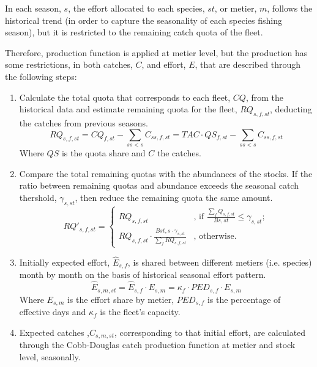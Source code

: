   In each season, $s$, the effort allocated to each species, $st$, or metier, $m$, follows the historical trend (in order to capture the 
  seasonality of each species fishing season), but it is restricted to the remaining catch quota of the fleet. 
  
  Therefore, production function is applied at metier level, but the production has some restrictions, 
  in both catches, $C$, and effort, $E$, that are described through the following steps: 
  
  \begin{enumerate}
    
    \item Calculate the total quota that corresponds to each fleet, $CQ$, from the historical data and estimate remaining
    quota for the fleet, $RQ_{s,f,st}$, deducting the catches from previous seasons.
  					$$RQ_{s,f,st} = CQ_{f,st} - \sum_{ss<s} {C_{ss,f,st}} = TAC \cdot QS_{f,st} - \sum_{ss<s} {C_{ss,f,st}}$$
    \noindent Where $QS$ is the quota share and $C$ the catches.
    
    \item Compare the total remaining quotas with the abundances of the stocks. If the ratio between remaining quotas and
    abundance exceeds the seasonal catch thershold, $\gamma_{s,st}$, then reduce the remaining quota the same amount.
    		\[
     			RQ'_{s,f,st} = \begin{cases}
       							RQ_{s,f,st} & \text{, if } \frac {\sum_f Q_{s,f,st}}{B{s,st}} \leq \gamma_{s,st}; \\
       							RQ_{s,f,st} \cdot  \frac{B{st,s} \cdot \gamma_{s,st}} {\sum_{f} RQ_{s,f,st}} & \text{, otherwise.} 
                     \end{cases}
    		\]
		
    \item Initially expected effort, $\hat E_{s,f}$, is shared between different metiers (i.e. species) month by month
    on the basis of historical seasonal effort pattern.
    				$$\hat E_{s,m,st} = \hat E_{s,f} \cdot E_{s,m} = \kappa_f \cdot PED_{s,f} \cdot  E_{s,m}$$
    \noindent Where $E_{s,m}$ is the effort share by metier, $PED_{s,f}$ is the percentage of effective days and $\kappa_f$ is the 
    fleet's capacity.

    \item Expected catches ,$\hat C_{s,m,st}$, corresponding to that initial effort, are calculated through the Cobb-Douglas catch
    production function at metier and stock level, seasonally.
    

\end{enumerate}
